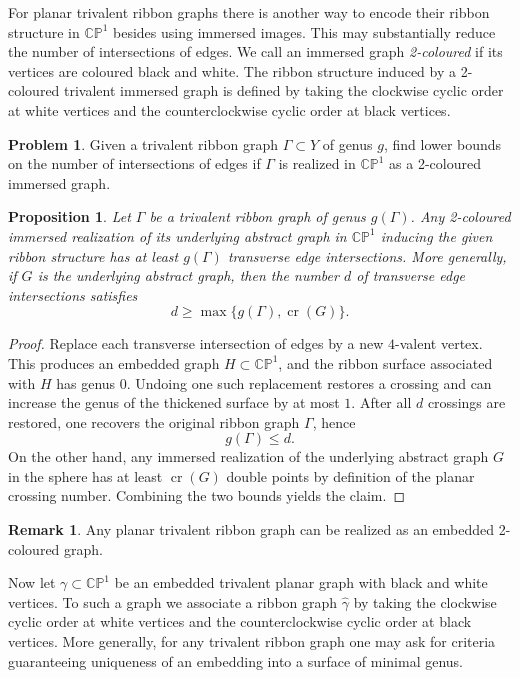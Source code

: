 \documentclass[reqno]{amsart}
\newtheorem{proposition}[theorem]{Proposition}
\theoremstyle{definition}
\newtheorem{remark}[theorem]{Remark}
\newtheorem{problem}[theorem]{Problem}
\newcommand {\ga}{\gamma}
\newcommand {\Ga}{\Gamma}
\newcommand {\bCP} {\mathbb {CP}}
\newcommand \crs {\operatorname{cr}}
\begin{document}
For planar trivalent ribbon graphs there is another way to encode their ribbon structure in $\bCP^1$ besides using immersed images. This may substantially reduce the number of intersections of edges. We call an immersed graph \emph{2-coloured} if its vertices are coloured black and white. The ribbon structure induced by a 2-coloured trivalent immersed graph is defined by taking the clockwise cyclic order at white vertices and the counterclockwise cyclic order at black vertices.

\begin{problem}
Given a trivalent ribbon graph $\Ga\subset Y$ of genus $g$, find lower bounds on the number of intersections of edges if $\Ga$ is realized in $\bCP^1$ as a 2-coloured immersed graph.
\end{problem}

\begin{proposition}\label{pr:2colorbound}
Let $\Ga$ be a trivalent ribbon graph of genus $g(\Ga)$. Any 2-coloured immersed realization of its underlying abstract graph in $\bCP^1$ inducing the given ribbon structure has at least $g(\Ga)$ transverse edge intersections. More generally, if $G$ is the underlying abstract graph, then the number $d$ of transverse edge intersections satisfies
\[
d\ge \max\{g(\Ga),\crs(G)\}.
\]
\end{proposition}

\begin{proof}
Replace each transverse intersection of edges by a new $4$-valent vertex. This produces an embedded graph $H\subset \bCP^1$, and the ribbon surface associated with $H$ has genus $0$. Undoing one such replacement restores a crossing and can increase the genus of the thickened surface by at most $1$. After all $d$ crossings are restored, one recovers the original ribbon graph $\Ga$, hence
\[
g(\Ga)\le d.
\]
On the other hand, any immersed realization of the underlying abstract graph $G$ in the sphere has at least $\crs(G)$ double points by definition of the planar crossing number. Combining the two bounds yields the claim.
\end{proof}

\begin{remark}
Any planar trivalent ribbon graph can be realized as an embedded 2-coloured graph.
\end{remark}

Now let $\ga\subset \bCP^1$ be an embedded trivalent planar graph with black and white vertices. To such a graph we associate a ribbon graph $\widehat \ga$ by taking the clockwise cyclic order at white vertices and the counterclockwise cyclic order at black vertices. More generally, for any trivalent ribbon graph one may ask for criteria guaranteeing uniqueness of an embedding into a surface of minimal genus.
\end{document}
